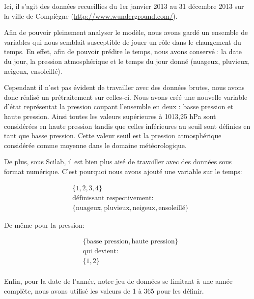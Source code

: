 \documentclass{article}
\begin{document}
\begin{multicols}{2}
Ici, il s’agit des données recueillies du 1er janvier 2013 au 31 décembre 2013
sur la ville de Compiègne (\url{http://www.wunderground.com/}).

Afin de pouvoir pleinement analyser le modèle, nous avons gardé un ensemble de
variables qui nous semblait susceptible de jouer un rôle dans le changement du
temps. En effet, afin de pouvoir prédire le temps, nous avons conservé : la date
du jour, la pression atmosphérique et le temps du jour donné (nuageux, pluvieux,
neigeux, ensoleillé).

Cependant il n’est pas évident de travailler avec des données brutes, nous avons
donc réalisé un prétraitement sur celles-ci. Nous avons créé une nouvelle
variable d'état représentat la pression coupant l’ensemble en deux : basse
pression et haute pression. Ainsi toutes les valeurs supérieures à 1013,25 hPa
sont considérées en haute pression tandis que celles inférieures au seuil sont
définies en tant que basse pression. Cette valeur seuil est la pression
atmosphérique considérée comme moyenne dans le domaine météorologique.

De plus, sous Scilab, il est bien plus aisé de travailler avec des données sous
format numérique. C’est pourquoi nous avons ajouté une variable sur le temps:

\begin{equation}
    \begin{split}
        & \{1, 2, 3, 4\} \\
        & \text{définissant respectivement: } \\
        & \{\text{nuageux}, \text{pluvieux}, \text{neigeux}, \text{ensoleillé}\}
    \end{split}
\end{equation}

De même pour la pression:

\begin{equation}
    \begin{split}
        & \{\text{basse pression}, \text{haute pression}\} \\
        & \text{qui devient: }               \\
        & \{1, 2\}                           \\
    \end{split}
\end{equation}

Enfin, pour la date de l’année, notre jeu de données se limitant à une année
complète, nous avons utilisé les valeurs de 1 à 365 pour les définir.


\end{multicols}
\end{document}
